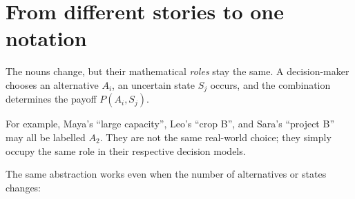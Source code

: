 	\section{From different stories to one notation}
	
	The nouns change, but their mathematical \emph{roles} stay the same. A
	decision-maker chooses an alternative \(A_i\), an uncertain state \(S_j\)
	occurs, and the combination determines the payoff \(P(A_i,S_j)\).
	
	For example, Maya's ``large capacity'', Leo's ``crop B'', and Sara's
	``project B'' may all be labelled \(A_2\). They are not the same real-world
	choice; they simply occupy the same role in their respective decision models.
	
	The same abstraction works even when the number of alternatives or states
	changes:
	
